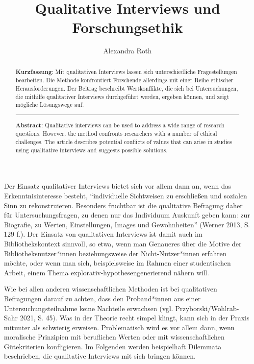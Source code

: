 \documentclass[a4paper,
fontsize=11pt,
oneside,
numbers=noperiodatend,
parskip=half-,
bibliography=totoc,
final
]{scrartcl}
\title{\LARGE{Qualitative Interviews und Forschungsethik}}%
\author{Alexandra Roth} %
\date{}
\begin{document}
\maketitle
\thispagestyle{fancyplain} 

\begin{abstract}
\noindent
\textbf{Kurzfassung}: Mit qualitativen Interviews lassen sich
unterschiedliche Fragestellungen bearbeiten. Die Methode konfrontiert
Forschende allerdings mit einer Reihe ethischer Herausforderungen. Der
Beitrag beschreibt Wertkonflikte, die sich bei Untersuchungen, die
mithilfe qualitativer Interviews durchgeführt werden, ergeben können,
und zeigt mögliche Lösungswege auf.

\begin{center}\rule{0.5\linewidth}{0.5pt}\end{center}

\noindent\textbf{Abstract}: Qualitative interviews can be used to address a wide
range of research questions. However, the method confronts researchers
with a number of ethical challenges. The article describes potential
conflicts of values that can arise in studies using qualitative
interviews and suggests possible solutions.
\end{abstract}

\vspace{0.5 cm}

Der Einsatz qualitativer Interviews bietet sich vor allem dann an, wenn
das Erkenntnisinteresse besteht, \enquote{individuelle Sichtweisen zu
erschließen und sozialen Sinn zu rekonstruieren. Besonders fruchtbar ist
die qualitative Befragung daher für Untersuchungsfragen, zu denen nur
das Individuum Auskunft geben kann: zur Biografie, zu Werten,
Einstellungen, Images und Gewohnheiten} (Werner 2013, S. 129 f.). Der
Einsatz von qualitativen Interviews ist damit auch im Bibliothekskontext
sinnvoll, so etwa, wenn man Genaueres über die Motive der
Bibliotheksnutzer*innen beziehungsweise der Nicht-Nutzer*innen erfahren
möchte, oder wenn man sich, beispielsweise im Rahmen einer studentischen
Arbeit, einem Thema explorativ-hypothesengene\-rierend nähern will.

Wie bei allen anderen wissenschaftlichen Methoden ist bei qualitativen
Befragungen darauf zu achten, dass den Proband*innen aus einer
Untersuchungsteilnahme keine Nachteile erwachsen (vgl.
Przyborski/Wohlrab-Sahr 2021, S. 45). Was in der Theorie recht simpel
klingt, kann sich in der Praxis mitunter als schwierig erweisen.
Problematisch wird es vor allem dann, wenn moralische Prinzipien mit
beruflichen Werten oder mit wissenschaftlichen Gütekriterien
konfligieren. Im Folgenden werden beispielhaft Dilemmata beschrieben,
die qualitative Interviews mit sich bringen können.
\end{document}
